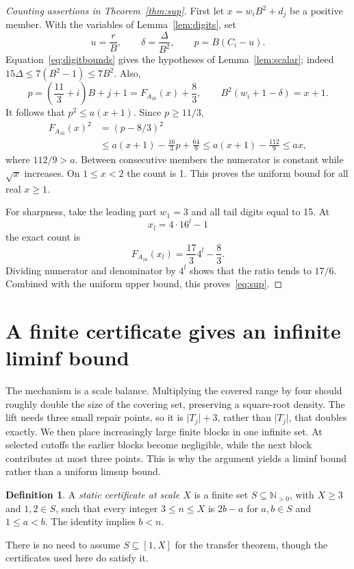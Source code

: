 \documentclass[11pt]{article}
\theoremstyle{definition}\newtheorem{definition}[theorem]{Definition}
\theoremstyle{remark}\newtheorem{remark}[theorem]{Remark}
\numberwithin{equation}{section}
\newcommand{\Np}{\mathbb N_{>0}}
\newcommand{\card}[1]{\lvert #1\rvert}
\begin{document}
\begin{proof}[Counting assertions in Theorem~\ref{thm:sup}]
First let $x=w_iB^2+d_j$ be a positive member. With the variables of Lemma~\ref{lem:digits}, set
\[
u=\frac rB,\qquad\delta=\frac\Delta{B^2},\qquad
p=B(C_i-u).
\]
Equation~\eqref{eq:digitbounds} gives the hypotheses of Lemma~\ref{lem:scalar}; indeed
$15\Delta\le7(B^2-1)\le7B^2$.
Also,
\[
p=\left(\frac{11}{3}+i\right)B+j+1
=F_{A_{16}}(x)+\frac83,
\qquad
B^2(w_i+1-\delta)=x+1.
\]
It follows that $p^2\le a(x+1)$. Since $p\ge11/3$,
\[
\begin{split}
F_{A_{16}}(x)^2
&=(p-8/3)^2\\
&\le a(x+1)-\frac{16}{3}p+\frac{64}{9}
\le a(x+1)-\frac{112}{9}\le ax,
\end{split}
\]
where $112/9>a$. Between consecutive members the numerator is constant while $\sqrt{x}$ increases. On $1\le x<2$ the count is 1. This proves the uniform bound for all real $x\ge1$.

For sharpness, take the leading part $w_1=3$ and all tail digits equal to 15. At
\[
x_l=4\cdot16^l-1
\]
the exact count is
\[
F_{A_{16}}(x_l)=\frac{17}{3}4^l-\frac83.
\]
Dividing numerator and denominator by $4^l$ shows that the ratio tends to $17/6$. Combined with the uniform upper bound, this proves~\eqref{eq:sup}.
\end{proof}

\section{A finite certificate gives an infinite liminf bound}\label{sec:transfer}
The mechanism is a scale balance. Multiplying the covered range by four should
roughly double the size of the covering set, preserving a square-root density.
The lift needs three small repair points, so it is $\card{T_j}+3$, rather than
$\card{T_j}$, that doubles exactly. We then place increasingly large finite
blocks in one infinite set. At selected cutoffs the earlier blocks become
negligible, while the next block contributes at most three points. This is why
the argument yields a liminf bound rather than a uniform limsup bound.
\begin{definition}
A \emph{static certificate at scale $X$} is a finite set $S\subseteq\Np$, with $X\ge3$ and $1,2\in S$, such that every integer $3\le n\le X$ is $2b-a$ for $a,b\in S$ and $1\le a<b$. The identity implies $b<n$.
\end{definition}
There is no need to assume $S\subseteq[1,X]$ for the transfer theorem, though the certificates used here do satisfy it.
\end{document}
